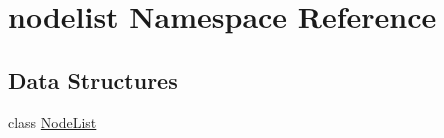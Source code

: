 \hypertarget{namespacenodelist}{
\section{nodelist Namespace Reference}
\label{namespacenodelist}
}


\subsection*{Data Structures}
\begin{CompactItemize}
\item 
class \hyperlink{classnodelist_1_1NodeList}{Node\-List}
\end{CompactItemize}
